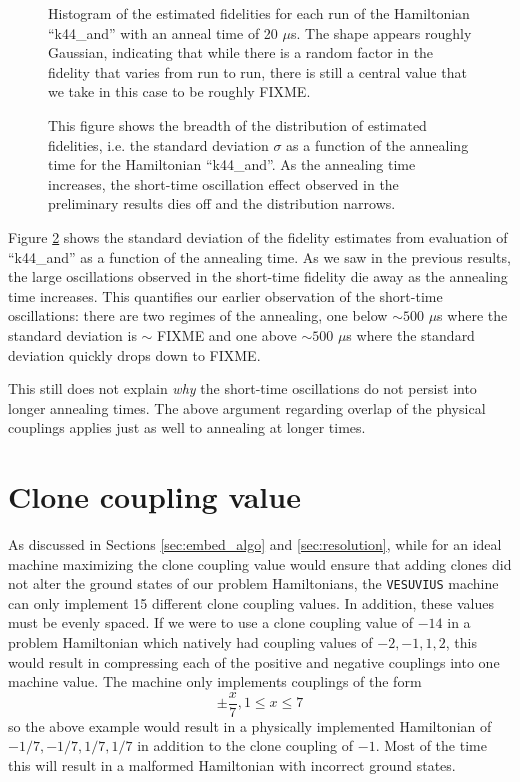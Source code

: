 \begin{figure}
	\caption[Estimated Fidelity Histogram]{Histogram of the estimated fidelities for each run of the Hamiltonian ``k44\_and'' with an anneal time of 20 $\mu$s.  The shape appears roughly Gaussian, indicating that while there is a random factor in the fidelity that varies from run to run, there is still a central value that we take in this case to be roughly FIXME.}
	\label{fig:hist}
\end{figure}

\begin{figure}
	\caption[Fidelity Distribution vs. Time]{This figure shows the breadth of the distribution of estimated fidelities, i.e. the standard deviation $\sigma$ as a function of the annealing time for the Hamiltonian ``k44\_and''.  As the annealing time increases, the short-time oscillation effect observed in the preliminary results dies off and the distribution narrows.}
	\label{fig:std_time}
\end{figure}

Figure \ref{fig:std_time} shows the standard deviation of the fidelity estimates from evaluation of ``k44\_and'' as a function of the annealing time.  As we saw in the previous results, the large oscillations observed in the short-time fidelity die away as the annealing time increases.  This quantifies our earlier observation of the short-time oscillations: there are two regimes of the annealing, one below $\sim 500$ $\mu$s where the standard deviation is $\sim$ FIXME and one above $\sim 500$ $\mu$s where the standard deviation quickly drops down to FIXME.

This still does not explain \emph{why} the short-time oscillations do not persist into longer annealing times.  The above argument regarding overlap of the physical couplings applies just as well to annealing at longer times.

\section{Clone coupling value}
\label{sec:coupling}
As discussed in Sections \ref{sec:embed_algo} and \ref{sec:resolution}, while for an ideal machine maximizing the clone coupling value would ensure that adding clones did not alter the ground states of our problem Hamiltonians, the \texttt{VESUVIUS} machine can only implement 15 different clone coupling values.  In addition, these values must be evenly spaced.  If we were to use a clone coupling value of $-14$ in a problem Hamiltonian which natively had coupling values of $-2,-1,1,2$, this would result in compressing each of the positive and negative couplings into one machine value.  The machine only implements couplings of the form 
\begin{equation}
	\pm\frac{x}{7}, 1 \le x \le 7
\end{equation}
so the above example would result in a physically implemented Hamiltonian of $-1/7, -1/7, 1/7, 1/7$ in addition to the clone coupling of $-1$.  Most of the time this will result in a malformed Hamiltonian with incorrect ground states.

